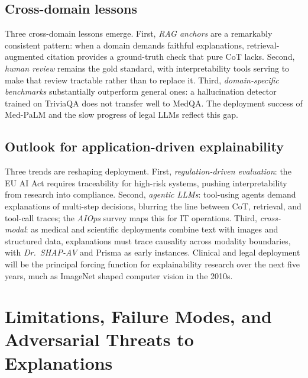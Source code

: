 \documentclass{article}
\begin{document}
\subsection{Cross-domain lessons}\label{cross-domain-lessons}

Three cross-domain lessons emerge. First, \emph{RAG anchors} are a remarkably consistent pattern: when a domain demands faithful explanations, retrieval-augmented citation provides a ground-truth check that pure CoT lacks. Second, \emph{human review} remains the gold standard, with interpretability tools serving to make that review tractable rather than to replace it. Third, \emph{domain-specific benchmarks} substantially outperform general ones: a hallucination detector trained on TriviaQA does not transfer well to MedQA. The deployment success of Med-PaLM and the slow progress of legal LLMs reflect this gap.

\subsection{Outlook for application-driven explainability}\label{outlook-for-application-driven-explainability}

Three trends are reshaping deployment. First, \emph{regulation-driven evaluation}: the EU AI Act requires traceability for high-risk systems, pushing interpretability from research into compliance. Second, \emph{agentic LLMs}: tool-using agents \citep{wang2023scottselfconsisten} demand explanations of multi-step decisions, blurring the line between CoT, retrieval, and tool-call traces; the \emph{AIOps} survey \citep{zhang2025jailbreakdistillat} maps this for IT operations. Third, \emph{cross-modal}: as medical and scientific deployments combine text with images and structured data, explanations must trace causality across modality boundaries, with \emph{Dr.~SHAP-AV} and Prisma \citep{joseph2025prismaanopensource} as early instances. Clinical and legal deployment will be the principal forcing function for explainability research over the next five years, much as ImageNet shaped computer vision in the 2010s.

\section{Limitations, Failure Modes, and Adversarial Threats to Explanations}\label{limitations-failure-modes-and-adversarial-threats-to-explanations}
\end{document}
